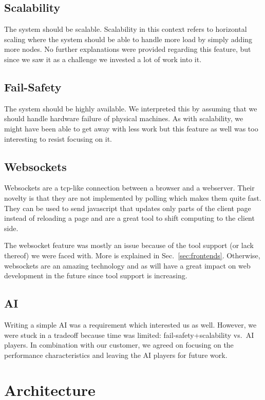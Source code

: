 \documentclass[11pt,a4paper]{report}
\begin{document}
\subsection{Scalability}
The system should be scalable. Scalability in this context refers to horizontal
scaling where the system should be able to handle more load by simply adding
more nodes. No further explanations were provided regarding this feature, but
since we saw it as a challenge we invested a lot of work into it.

\subsection{Fail-Safety}
The system should be highly available. We interpreted this by assuming that we
should handle hardware failure of physical machines. As with scalability, we
might have been able to get away with less work but this feature as well was
too interesting to resist focusing on it.

\subsection{Websockets}
Websockets\cite{websockets} are a tcp-like connection between a browser and a
webserver.
Their novelty is that they are not implemented by polling which makes them quite
fast.
They can be used to send javascript that updates only parts of the client page
instead of reloading a page and are a great tool to shift computing to the
client side.

The websocket feature was mostly an issue because of the tool support (or lack
thereof) we were faced with. More is explained in Sec.~\ref{sec:frontends}.
Otherwise, websockets are an amazing technology and as will have a great impact
on web development in the future since tool support is increasing.

\subsection{AI}
Writing a simple AI was a requirement which interested us as well. However, we
were stuck in a tradeoff because time was limited: fail-safety+scalability
vs.\ AI players. In combination with our customer, we agreed on focusing on the
performance characteristics and leaving the AI players for future work.

\section{Architecture}
\end{document}
